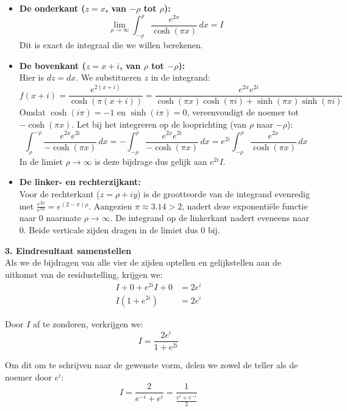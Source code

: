 \documentclass[a4paper,twoside]{article}
\theoremstyle{definition}
\theoremstyle{plain}
\begin{document}
\begin{itemize}
    \item \textbf{De onderkant ($z = x$, van $-\rho$ tot $\rho$):}
    \[ \lim_{\rho \to \infty} \int_{-\rho}^{\rho} \frac{e^{2x}}{\cosh(\pi x)} \, dx = I \]
    Dit is exact de integraal die we willen berekenen.

    \item \textbf{De bovenkant ($z = x + i$, van $\rho$ tot $-\rho$):} \\
    Hier is $dz = dx$. We substitueren $z$ in de integrand:
    \[ f(x+i) = \frac{e^{2(x+i)}}{\cosh(\pi(x+i))} = \frac{e^{2x}e^{2i}}{\cosh(\pi x)\cosh(\pi i) + \sinh(\pi x)\sinh(\pi i)} \]
    Omdat $\cosh(i\pi) = -1$ en $\sinh(i\pi) = 0$, vereenvoudigt de noemer tot $-\cosh(\pi x)$. Let bij het integreren op de looprichting (van $\rho$ naar $-\rho$):
    \[ \int_{\rho}^{-\rho} \frac{e^{2x}e^{2i}}{-\cosh(\pi x)} \, dx = - \int_{-\rho}^{\rho} \frac{e^{2x}e^{2i}}{-\cosh(\pi x)} \, dx = e^{2i} \int_{-\rho}^{\rho} \frac{e^{2x}}{\cosh(\pi x)} \, dx \]
    In de limiet $\rho \to \infty$ is deze bijdrage dus gelijk aan $e^{2i}I$.

    \item \textbf{De linker- en rechterzijkant:} \\
    Voor de rechterkant ($z = \rho + iy$) is de grootteorde van de integrand evenredig met $\frac{e^{2\rho}}{e^{\pi\rho}} = e^{(2-\pi)\rho}$. Aangezien $\pi \approx 3.14 > 2$, nadert deze exponentiële functie naar $0$ naarmate $\rho \to \infty$. De integrand op de linkerkant nadert eveneens naar $0$. Beide verticale zijden dragen in de limiet dus $0$ bij.
\end{itemize}

\vspace{0.3cm}
\noindent \textbf{3. Eindresultaat samenstellen} \\
Als we de bijdragen van alle vier de zijden optellen en gelijkstellen aan de uitkomst van de residustelling, krijgen we:
\begin{align*}
    I + 0 + e^{2i}I + 0 &= 2e^i \\
    I (1 + e^{2i}) &= 2e^i
\end{align*}

\noindent Door $I$ af te zonderen, verkrijgen we:
\[ I = \frac{2e^i}{1 + e^{2i}} \]

\noindent Om dit om te schrijven naar de gewenste vorm, delen we zowel de teller als de noemer door $e^i$:
\[ I = \frac{2}{e^{-i} + e^i} = \frac{1}{\frac{e^i + e^{-i}}{2}} \]
\end{document}
